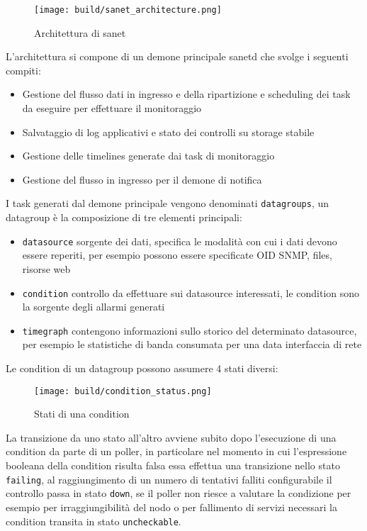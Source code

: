 \begin{figure}[H]
    \centering
    \texttt{[image: build/sanet\_architecture.png]}
    \caption{Architettura di sanet}
    \label{fig:enter-label}
\end{figure}

L'architettura si compone di un demone principale sanetd che svolge i seguenti compiti:

\begin{itemize}
  \item{Gestione del flusso dati in ingresso e della ripartizione e scheduling dei task da eseguire per effettuare il monitoraggio}
  \item{Salvataggio di log applicativi e stato dei controlli su storage stabile}
  \item{Gestione delle timelines generate dai task di monitoraggio}
  \item{Gestione del flusso in ingresso per il demone di notifica}
\end{itemize}

I task generati dal demone principale vengono denominati \verb|datagroups|, un datagroup è la composizione di tre elementi principali:

\begin{itemize}
  \item \verb|datasource| sorgente dei dati, specifica le modalità con cui i dati devono essere reperiti, per esempio possono essere specificate OID SNMP, files, risorse web
  \item \verb|condition| controllo da effettuare sui datasource interessati, le condition sono la sorgente degli allarmi generati
  \item \verb|timegraph| contengono informazioni sullo storico del determinato datasource, per esempio le statistiche di banda consumata per una data interfaccia di rete
\end{itemize}

Le condition di un datagroup possono assumere 4 stati diversi:

\begin{figure}[H]
    \centering
    \texttt{[image: build/condition\_status.png]}
    \caption{Stati di una condition}
    \label{fig:enter-label}
\end{figure}

La transizione da uno stato all'altro avviene subito dopo l'esecuzione di una condition da parte di un poller, in particolare nel momento in cui l'espressione booleana della condition risulta falsa essa effettua una transizione nello stato \verb|failing|, al raggiungimento di un numero di tentativi falliti configurabile il controllo passa in stato \verb|down|, se il poller non riesce a valutare la condizione per esempio per irraggiungibilità del nodo o per fallimento di servizi necessari la condition transita in stato \verb|uncheckable|.

